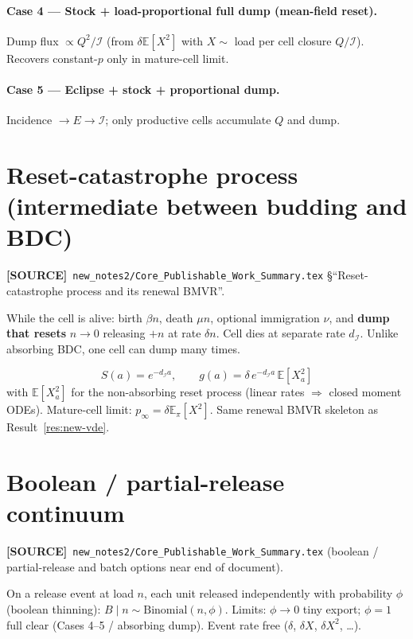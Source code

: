 \documentclass[11pt,a4paper]{article}
\newcommand{\E}{\mathbb{E}}
\newcommand{\Icell}{\mathcal{I}}
\theoremstyle{plain}
\theoremstyle{definition}
\theoremstyle{remark}
\newcommand{\SOURCE}{\textcolor{gray!50!black}{\textbf{[SOURCE]}}}
\begin{document}
\paragraph{Case 4 --- Stock + load-proportional full dump (mean-field reset).}
Dump flux $\propto Q^2/\Icell$ (from $\delta\E[X^2]$ with $X\sim$ load per cell
closure $Q/\Icell$). Recovers constant-$p$ only in mature-cell limit.

\paragraph{Case 5 --- Eclipse + stock + proportional dump.}
Incidence $\to E\to\Icell$; only productive cells accumulate $Q$ and dump.

\section{Reset-catastrophe process (intermediate between budding and BDC)}
\label{sec:reset}
\SOURCE\
\texttt{new\_notes2/Core\_Publishable\_Work\_Summary.tex}
\S``Reset-catastrophe process and its renewal BMVR''.

While the cell is alive: birth $\beta n$, death $\mu n$, optional immigration
$\nu$, and \textbf{dump that resets} $n\to 0$ releasing $+n$ at rate $\delta n$.
Cell dies at separate rate $d_{\Icell}$. Unlike absorbing BDC, one cell can dump
many times.

\begin{equation}
S(a)=e^{-d_{\Icell}a},\qquad
g(a)=\delta\,e^{-d_{\Icell}a}\,\E[X_a^2]
\end{equation}
with $\E[X_a^2]$ for the non-absorbing reset process (linear rates $\Rightarrow$
closed moment ODEs). Mature-cell limit: $p_\infty=\delta\E_\pi[X^2]$.
Same renewal BMVR skeleton as Result~\ref{res:new-vde}.

\section{Boolean / partial-release continuum}
\label{sec:boolean}
\SOURCE\
\texttt{new\_notes2/Core\_Publishable\_Work\_Summary.tex}
(boolean / partial-release and batch options near end of document).

On a release event at load $n$, each unit released independently with
probability $\phi$ (boolean thinning):
$B\mid n\sim\mathrm{Binomial}(n,\phi)$. Limits: $\phi\to 0$ tiny export;
$\phi=1$ full clear (Cases 4--5 / absorbing dump). Event rate free
($\delta$, $\delta X$, $\delta X^2$, \ldots).
\end{document}

